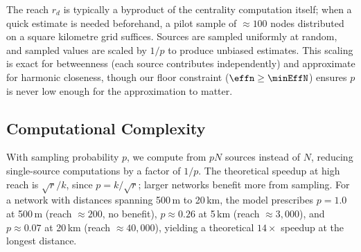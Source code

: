 The reach $r_d$ is typically a byproduct of the centrality computation itself; when a quick estimate is needed beforehand, a pilot sample of $\approx 100$ nodes distributed on a square kilometre grid suffices. Sources are sampled uniformly at random, and sampled values are scaled by $1/p$ to produce unbiased estimates. This scaling is exact for betweenness (each source contributes independently) and approximate for harmonic closeness, though our floor constraint ($\effn \geq \minEffN$) ensures $p$ is never low enough for the approximation to matter.

\subsection{Computational Complexity}

With sampling probability $p$, we compute from $pN$ sources instead of $N$, reducing single-source computations by a factor of $1/p$. The theoretical speedup at high reach is $\sqrt{r}/k$, since $p = k/\sqrt{r}$; larger networks benefit more from sampling. For a network with distances spanning 500\,m to 20\,km, the model prescribes $p = 1.0$ at 500\,m (reach $\approx 200$, no benefit), $p \approx 0.26$ at 5\,km (reach $\approx 3{,}000$), and $p \approx 0.07$ at 20\,km (reach $\approx 40{,}000$), yielding a theoretical $14\times$ speedup at the longest distance.
